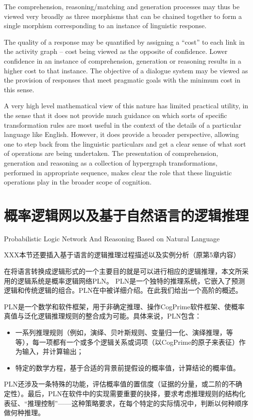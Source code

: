 The comprehension, reasoning/matching and generation processes may thus be viewed very broadly as three  morphisms that can be chained together to form a single morphism corresponding to an instance of linguistic response.

The quality of a response may be quantified by assigning a ``cost'' to each link in the activity graph -- cost being viewed as the opposite of confidence.  Lower confidence in an instance of comprehension, generation or reasoning results in a higher cost to that instance.   The objective of a dialogue system may be viewed as the provision of responses that meet pragmatic goals with the minimum cost in this sense.

A very high level mathematical view of this nature has limited practical utility, in the sense that it does not provide much guidance on which sorts of specific transformation rules are most useful in the context of the details of a particular language like English.   However, it does provide a broader perspective, allowing one to step back from the linguistic particulars and get a clear sense of what sort of operations are being undertaken.   The presentation of comprehension, generation and reasoning as a collection of hypergraph transformations, performed in appropriate sequence, makes clear the role that these linguistic operations play in the broader scope of cognition.

\section{概率逻辑网以及基于自然语言的逻辑推理}{Probabilistic Logic Network And Reasoning Based on Natural Language}
\label{sec:pln}

XXX本节还要插入基于语言的逻辑推理过程描述以及实例分析（原第5章内容）

在将语言转换成逻辑形式的一个主要目的就是可以进行相应的逻辑推理，本文所采用的逻辑系统是概率逻辑网络PLN。 PLN是一个独特的推理系统，它嵌入了预测逻辑和传统逻辑的组合。PLN在\cite{Goertzel2008, RWR}中被详细介绍。在此我们给出一个高阶的概述。

PLN是一个数学和软件框架，用于非确定推理、操作CogPrime软件框架、使概率真值与泛化逻辑推理规则的整合成为可能。具体来说，PLN包含：

\begin{itemize}
\item 一系列推理规则（例如，演绎、贝叶斯规则、变量归一化、演绎推理，等等），每一项都有一个或多个逻辑关系或词项（以CogPrime的原子来表征）作为输入，并计算输出；
\item 特定的数学方程，基于合适的背景前提假设的概率值，计算结论的概率值。
\end{itemize}
PLN还涉及一条特殊的功能，评估概率值的置信度（证据的分量，或二阶的不确定性）。最后，PLN在软件中的实现需要重要的抉择，要求考虑推理规则的结构化表征、“推理控制”——这种策略要求，在每个特定的实际情况中，判断以何种顺序做何种推理。

